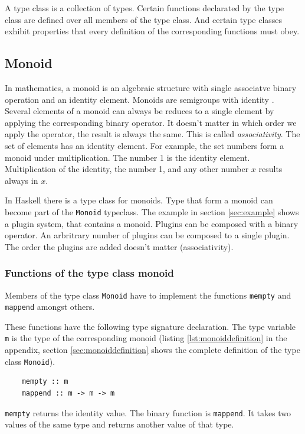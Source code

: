 A type class is a collection of types. Certain functions declarated by the type class are defined over all members of the type class. And certain type classes exhibit properties that every definition of the corresponding functions must obey.

\subsection{Monoid}
\label{sec:monoid}

In mathematics, a \gls{monoid} is an algebraic structure with single associatve binary operation and an identity element. Monoids are semigroups with identity \cite{wiki:monoid}. Several elements of a monoid can always be reduces to a single element by applying the corresponding binary operator. It doesn't matter in which order we apply the operator, the result is always the same. This is called \emph{\gls{associativity}}. The set of elements has an identity element. For example, the set numbers form a monoid under multiplication. The number 1 is the identity element. Multiplication of the identity, the number 1, and any other number $x$ results always in $x$.

In Haskell there is a type class for monoids. Type that form a monoid can become part of the \verb|Monoid| typeclass. The example in section \ref{sec:example} shows a plugin system, that contains a monoid. Plugins can be composed with a binary operator. An arbritrary number of plugins can be composed to a single plugin. The order the plugins are added doesn't matter (\gls{associativity}). 

\subsubsection{Functions of the type class monoid}

Members of the type class \verb|Monoid| have to implement the functions \verb|mempty| and \verb|mappend| amongst others.

These functions have the following type signature declaration. The type variable \verb|m| is the type of the corresponding monoid (listing \ref{lst:monoiddefinition} in the appendix, section \ref{sec:monoiddefinition} shows the complete definition of the type class \verb|Monoid|).
\begin{verbatim}
    mempty :: m
    mappend :: m -> m -> m
\end{verbatim}

\verb|mempty| returns the identity value. The binary function is \verb|mappend|. It takes two values of the same type and returns another value of that type. 

